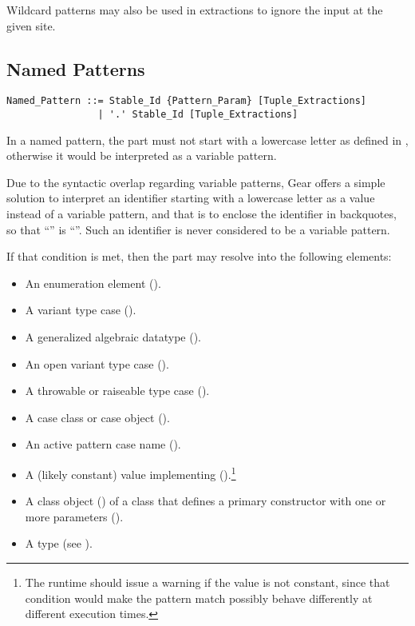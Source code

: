 Wildcard patterns may also be used in extractions to ignore the input at the given site. 





\subsection{Named Patterns}
\label{sec:named-patterns}

\syntax\begin{lstlisting}
Named_Pattern ::= Stable_Id {Pattern_Param} [Tuple_Extractions]
                | '.' Stable_Id [Tuple_Extractions]
\end{lstlisting}

In a named pattern, the  part must not start with a lowercase letter as defined in , otherwise it would be interpreted as a variable pattern. 

Due to the syntactic overlap regarding variable patterns, Gear offers a simple solution to interpret an identifier starting with a lowercase letter as a value instead of a variable pattern, and that is to enclose the identifier in backquotes, so that ``'' is ``''. Such an identifier is never considered to be a variable pattern. 

If that condition is met, then the  part may resolve into the following elements:
\begin{itemize}
  \item An enumeration element (). 
  \item A variant type case (). 
  \item A generalized algebraic datatype (). 
  \item An open variant type case (). 
  \item A throwable or raiseable type case (). 
  \item A case class or case object (). 
  \item An active pattern case name (). 
  \item A (likely constant) value implementing  ().\footnote{The runtime should issue a warning if the value is not constant, since that condition would make the pattern match possibly behave differently at different execution times.}
  \item A class object () of a class that defines a primary constructor with one or more parameters ().
  \item A type (see ).
\end{itemize}

